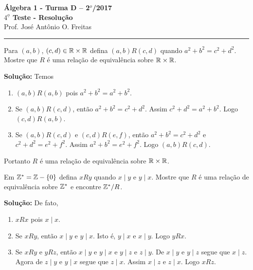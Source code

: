 \documentclass[12pt]{article}
\begin{document}


\begin{center}
{\Large\bf {\'A}lgebra 1 - Turma D -- 2$^{o}$/2017} \\ \vspace{9pt} {\large\bf
  $4^{\underline{o}}$ Teste - Resolu\c{c}\~ao}\\
\vspace{9pt} Prof. Jos{\'e} Ant{\^o}nio O. Freitas
\end{center}
\hrule

\vspace{.6cm}

\questao Para $(a,b)$, $(c,d) \in \mathbb{R} \times \mathbb{R}$ defina $(a,b)R(c,d)$ quando $a^2 + b^2 = c^2 + d^2$. Mostre que $R$ é uma relação de equivalência sobre $\mathbb{R} \times \mathbb{R}$.

\noindent\textbf{Solu\c{c}\~ao:} Temos
\begin{enumerate}[label={\roman*})]
	\item $(a,b)R(a,b)$ pois $a^2 + b^2 = a^2 + b^2$.
	\item Se $(a,b)R(c,d)$, então $a^2 + b^2 = c^2 + d^2$. Assim $c^2 + d^2 = a^2 +  b^2$. Logo $(c,d)R(a,b)$.
	\item Se $(a,b)R(c,d)$ e $(c,d)R(e,f)$, então $a^2 + b^2 = c^2 + d^2$ e $c^2 + d^2 = e^2 + f^2$. Assim $a^2 + b^2 = e^2 + f^2$. Logo $(a,b)R(c,d)$.
\end{enumerate}

Portanto $R$ é uma relação de equivalência sobre $\mathbb{R} \times \mathbb{R}$.


\vspace{.5cm}

\questao Em $\mathbb{Z}^* = \mathbb{Z} - \{0\}$ defina $xRy$ quando $x \mid y$ e $y \mid x$. Mostre que $R$ é uma relação de equivalência sobre $\mathbb{Z}^*$ e encontre $\mathbb{Z}^*/R$.

\noindent\textbf{Solu\c{c}\~ao:} De fato,
	\begin{enumerate}[label={\alph*})]
		\item $xRx$ pois $x \mid x$.

		\item Se $xRy$, então $x \mid y$ e $y \mid x$. Isto é, $y \mid x$ e $x \mid y$. Logo $yRx$.

		\item Se $xRy$ e $yRz$, então $x \mid y$ e $y \mid x$ e $y \mid z$ e $z \mid y$. De $x \mid y$ e $y \mid z$ segue que $x \mid z$. Agora de $z \mid y$ e $y \mid x$ segue que $z \mid x$. Assim $x \mid z$ e $z \mid x$. Logo $xRz$.
	\end{enumerate}
\end{document}
